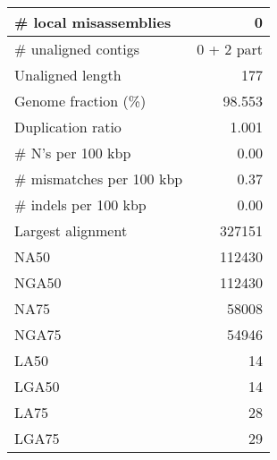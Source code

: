 \documentclass[12pt,a4paper]{article}
\begin{document}
\begin{table}[ht]
\begin{center}
\begin{tabular}{|l*{1}{|r}|}
\# local misassemblies & 0 \\ \hline
\# unaligned contigs & 0 + 2 part \\ \hline
Unaligned length & 177 \\ \hline
Genome fraction (\%) & 98.553 \\ \hline
Duplication ratio & 1.001 \\ \hline
\# N's per 100 kbp & 0.00 \\ \hline
\# mismatches per 100 kbp & 0.37 \\ \hline
\# indels per 100 kbp & 0.00 \\ \hline
Largest alignment & 327151 \\ \hline
NA50 & 112430 \\ \hline
NGA50 & 112430 \\ \hline
NA75 & 58008 \\ \hline
NGA75 & 54946 \\ \hline
LA50 & 14 \\ \hline
LGA50 & 14 \\ \hline
LA75 & 28 \\ \hline
LGA75 & 29 \\ \hline
\end{tabular}
\end{center}
\end{table}
\end{document}
